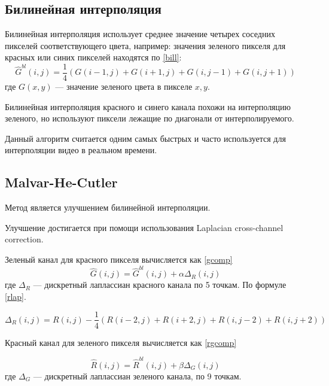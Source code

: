 
\newpage 

\subsection{Билинейная интерполяция}
Билинейная интерполяция использует среднее значение четырех соседних пикселей соответствующего цвета, например: значения зеленого пикселя для красных или синих пикселей находятся по \ref{bill}:
\begin{equation}
	\label{bill}
	\hat{G}^{bl}(i,j) = \frac{1}{4}(G(i-1,j) + G(i+1,j) + G(i,j-1) + G(i,j+1))
\end{equation}
где $G(x,y)$ --- значение зеленого цвета в пикселе $x,y$. \cite{mhcd}

Билинейная интерполяция красного и синего канала похожи на интерполяцию зеленого, но используют пиксели лежащие по диагонали от интерполируемого.

Данный алгоритм считается одним самых быстрых и часто используется для интерполяции видео в реальном времени. \cite{bilinear}

\subsection{Malvar-He-Cutler}

Метод является улучшением билинейной интерполяции.

Улучшение достигается при помощи использования Laplacian cross-channel correction. 

Зеленый канал для красного пикселя вычисляется как \ref{gcomp}
\begin{equation}
	\label{gcomp}
	\hat{G}(i,j) = \hat{G}^{bl}(i,j) + \alpha\Delta_{R}(i,j) 
\end{equation}
где $\Delta_{R}$ --- дискретный лаплассиан красного канала по 5 точкам. По формуле \ref{rlap}.

\begin{equation}
	\label{rlap}
	\Delta_{R}(i,j) = R(i,j) - \frac{1}{4} (R(i-2,j) + R(i+2,j)+R(i,j-2)+R(i,j+2))
\end{equation}

Красный канал для зеленого пикселя вычисляется как \ref{rgcomp}

\begin{equation}
	\label{rgcomp}
	\hat{R}(i,j) = \hat{R}^{bl}(i,j) + \beta\Delta_{G}(i,j) 
\end{equation}
где $\Delta_{G}$ --- дискретный лаплассиан зеленого канала, по 9 точкам.

